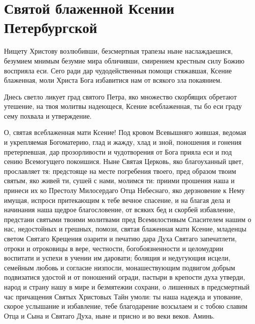 
 

\section{Святой блаженной Ксении Петербургской}
 


Нищету Христову возлюбивши, безсмертныя трапезы ныне наслаждаешися, безумием мнимым безумие мира обличивши, смирением крестным силу Божию восприяла еси. Сего ради дар чудодейственныя помощи стяжавшая, Ксение блаженная, моли Христа Бога избавитися нам от всякого зла покаянием.




Днесь светло ликует град святого Петра, яко множество скорбящих обретают утешение, на твоя молитвы надеющеся, Ксение всеблаженная, ты бо еси граду сему похвала и утверждение.




О, святая всеблаженная мати Ксение! Под кровом Всевышняго жившая, ведомая и укрепляемая Богоматерию, глад и жажду, хлад и зной, поношения и гонения претерпевшая, дар прозорливости и чудотворения от Бога прияла еси и под сению Всемогущего покоишися. Ныне Святая Церковь, яко благоуханный цвет, прославляет тя: предстояще на месте погребения твоего, пред образом твоим святым, яко живей ти, сушей с нами, молимся ти: приими прошения наша и принеси их ко Престолу Милосердаго Отца Небеснаго, яко дерзновение к Нему имущая, испроси притекающим к тебе вечное спасение, и на благая дела и начинания наша щедрое благословение, от всяких бед и скорбей избавление, предстани святыми твоими молитвами пред Всемилостивым Спасителем нашим о нас, недостойных и грешных, помози, святая блаженная мати Ксение, младенцы светом Святаго Крещения озарити и печатию дара Духа Святаго запечатлети, отроки и отроковицы в вере, честности, богобоязненности и целомудрии воспитати и успехи в учении им даровати; болящия и недугующия исцели, семейным любовь и согласие низпосли, монашествующим подвигом добрым подвизатися удостой и от поношений огради, пастыри в крепости духа утверди, народ и страну нашу в мире и безмятежии сохрани, о лишенных в предсмертный час причащения Святых Христовых Тайн умоли: ты наша надежда и упование, скорое услышание и избавление, тебе благодарение возсылаем и с тобою славим Отца и Сына и Святаго Духа, ныне и присно и во веки веков. Аминь.

